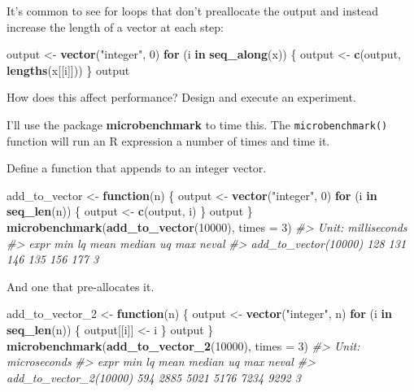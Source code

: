 \documentclass[]{book}
\newenvironment{Shaded}{\begin{snugshade}}{\end{snugshade}}
\newcommand{\CommentTok}[1]{\textcolor[rgb]{0.56,0.35,0.01}{\textit{#1}}}
\newcommand{\ControlFlowTok}[1]{\textcolor[rgb]{0.13,0.29,0.53}{\textbf{#1}}}
\newcommand{\DataTypeTok}[1]{\textcolor[rgb]{0.13,0.29,0.53}{#1}}
\newcommand{\DecValTok}[1]{\textcolor[rgb]{0.00,0.00,0.81}{#1}}
\newcommand{\KeywordTok}[1]{\textcolor[rgb]{0.13,0.29,0.53}{\textbf{#1}}}
\newcommand{\NormalTok}[1]{#1}
\newcommand{\StringTok}[1]{\textcolor[rgb]{0.31,0.60,0.02}{#1}}
\theoremstyle{plain}
\theoremstyle{remark}
\begin{document}
It's common to see for loops that don't preallocate the output and instead increase the length of a vector at each step:

\begin{Shaded}
\begin{Highlighting}[]
\NormalTok{output <-}\StringTok{ }\KeywordTok{vector}\NormalTok{(}\StringTok{"integer"}\NormalTok{, }\DecValTok{0}\NormalTok{)}
\ControlFlowTok{for}\NormalTok{ (i }\ControlFlowTok{in} \KeywordTok{seq_along}\NormalTok{(x)) \{}
\NormalTok{  output <-}\StringTok{ }\KeywordTok{c}\NormalTok{(output, }\KeywordTok{lengths}\NormalTok{(x[[i]]))}
\NormalTok{\}}
\NormalTok{output}
\end{Highlighting}
\end{Shaded}

How does this affect performance? Design and execute an experiment.

I'll use the package \textbf{microbenchmark} to time this.
The \texttt{microbenchmark()} function will run an R expression a number of times and time it.

Define a function that appends to an integer vector.

\begin{Shaded}
\begin{Highlighting}[]
\NormalTok{add_to_vector <-}\StringTok{ }\ControlFlowTok{function}\NormalTok{(n) \{}
\NormalTok{  output <-}\StringTok{ }\KeywordTok{vector}\NormalTok{(}\StringTok{"integer"}\NormalTok{, }\DecValTok{0}\NormalTok{)}
  \ControlFlowTok{for}\NormalTok{ (i }\ControlFlowTok{in} \KeywordTok{seq_len}\NormalTok{(n)) \{}
\NormalTok{    output <-}\StringTok{ }\KeywordTok{c}\NormalTok{(output, i)}
\NormalTok{  \}}
\NormalTok{  output  }
\NormalTok{\}}
\KeywordTok{microbenchmark}\NormalTok{(}\KeywordTok{add_to_vector}\NormalTok{(}\DecValTok{10000}\NormalTok{), }\DataTypeTok{times =} \DecValTok{3}\NormalTok{)}
\CommentTok{#> Unit: milliseconds}
\CommentTok{#>                  expr min  lq mean median  uq max neval}
\CommentTok{#>  add_to_vector(10000) 128 131  146    135 156 177     3}
\end{Highlighting}
\end{Shaded}

And one that pre-allocates it.

\begin{Shaded}
\begin{Highlighting}[]
\NormalTok{add_to_vector_}\DecValTok{2}\NormalTok{ <-}\StringTok{ }\ControlFlowTok{function}\NormalTok{(n) \{}
\NormalTok{  output <-}\StringTok{ }\KeywordTok{vector}\NormalTok{(}\StringTok{"integer"}\NormalTok{, n)}
  \ControlFlowTok{for}\NormalTok{ (i }\ControlFlowTok{in} \KeywordTok{seq_len}\NormalTok{(n)) \{}
\NormalTok{    output[[i]] <-}\StringTok{ }\NormalTok{i}
\NormalTok{  \}}
\NormalTok{  output}
\NormalTok{\}}
\KeywordTok{microbenchmark}\NormalTok{(}\KeywordTok{add_to_vector_2}\NormalTok{(}\DecValTok{10000}\NormalTok{), }\DataTypeTok{times =} \DecValTok{3}\NormalTok{)}
\CommentTok{#> Unit: microseconds}
\CommentTok{#>                    expr min   lq mean median   uq  max neval}
\CommentTok{#>  add_to_vector_2(10000) 594 2885 5021   5176 7234 9292     3}
\end{Highlighting}
\end{Shaded}
\end{document}
